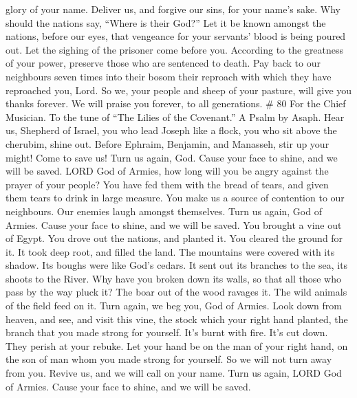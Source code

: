 glory of your name. Deliver us, and forgive our sins, for your name's
sake.  Why should the nations say, ``Where is their
God?'' Let it be known amongst the nations, before our eyes, that
vengeance for your servants' blood is being poured out. 
Let the sighing of the prisoner come before you. According to the
greatness of your power, preserve those who are sentenced to death.
 Pay back to our neighbours seven times into their bosom
their reproach with which they have reproached you, Lord.
 So we, your people and sheep of your pasture, will give
you thanks forever. We will praise you forever, to all generations. \#
80 For the Chief Musician. To the tune of ``The Lilies of the
Covenant.'' A Psalm by Asaph.  Hear us, Shepherd of
Israel, you who lead Joseph like a flock, you who sit above the
cherubim, shine out.  Before Ephraim, Benjamin, and
Manasseh, stir up your might! Come to save us!  Turn us
again, God. Cause your face to shine, and we will be saved.
 LORD God of Armies, how long will you be angry against
the prayer of your people?  You have fed them with the
bread of tears, and given them tears to drink in large measure.
 You make us a source of contention to our neighbours. Our
enemies laugh amongst themselves.  Turn us again, God of
Armies. Cause your face to shine, and we will be saved. 
You brought a vine out of Egypt. You drove out the nations, and planted
it.  You cleared the ground for it. It took deep root, and
filled the land.  The mountains were covered with its
shadow. Its boughs were like God's cedars.  It sent out
its branches to the sea, its shoots to the River.  Why
have you broken down its walls, so that all those who pass by the way
pluck it?  The boar out of the wood ravages it. The wild
animals of the field feed on it.  Turn again, we beg you,
God of Armies. Look down from heaven, and see, and visit this vine,
 the stock which your right hand planted, the branch that
you made strong for yourself.  It's burnt with fire. It's
cut down. They perish at your rebuke.  Let your hand be
on the man of your right hand, on the son of man whom you made strong
for yourself.  So we will not turn away from you. Revive
us, and we will call on your name.  Turn us again, LORD
God of Armies. Cause your face to shine, and we will be saved.

